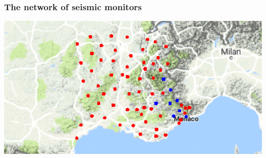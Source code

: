 \documentclass{beamer}
\begin{document}
\begin{frame}
\frametitle{The network of seismic monitors}
\includegraphics[width=\textwidth]{TestStations_zoom.png}
\end{frame}
\end{document}
